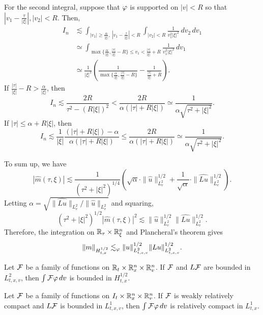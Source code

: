 \documentclass[12pt]{article}
\begin{document}
\begin{pf}
For the second integral, suppose that $\varphi$ is supported on $|v|<R$ so that $|v_1-\frac\tau{|\xi|}|,|v_2|<R$.
Then,
\begin{align*}
I_n&\lesssim\int_{|v_1|\ge\frac\alpha{|\xi|},\ |v_1-\frac\tau{|\xi|}|<R}\int_{|v_2|<R}\frac1{v_1^2|\xi|^2}\,dv_2\,dv_1\\
&\simeq\int_{\max\{\frac\alpha{|\xi|},\frac{|\tau|}{|\xi|}-R\}\le v_1<\frac{|\tau|}{|\xi|}+R}\frac1{v_1^2|\xi|^2}\,dv_1\\
&\simeq\frac1{|\xi|^2}(\frac1{\max\{\frac\alpha{|\xi|},\frac{|\tau|}{|\xi|}-R\}}-\frac1{\frac{|\tau|}{|\xi|}+R}).
\end{align*}
If $\frac{|\tau|}{|\xi|}-R>\frac\alpha{|\xi|}$, then
\[I_n\lesssim\frac{2R}{\tau^2-(R|\xi|)^2}<\frac{2R}{\alpha(|\tau|+R|\xi|)}\simeq\frac1{\alpha\sqrt{\tau^2+|\xi|^2}}.\]
If $|\tau|\le\alpha+R|\xi|$, then
\[I_n\lesssim\frac1{|\xi|}\frac{(|\tau|+R|\xi|)-\alpha}{\alpha(|\tau|+R|\xi|)}\le\frac{2R}{\alpha(|\tau|+R|\xi|)}\simeq\frac1{\alpha\sqrt{\tau^2+|\xi|^2}}.\]

To sum up, we have
\[|\hat m(\tau,\xi)|\lesssim\frac1{(\tau^2+|\xi|^2)^{1/4}}(\sqrt\alpha\cdot\|\hat u\|_{L_v^2}^{1/2}+\frac1{\sqrt\alpha}\cdot\|\hat{Lu}\|_{L_v^2}^{1/2}).\]
Letting $\alpha=\sqrt{\|\hat{Lu}\|_{L_v^2}/\|\hat u\|_{L_v^2}}$ and squaring,
\[(\tau^2+|\xi|^2)^{1/2}|\hat m(\tau,\xi)|^2\lesssim\|\hat u\|_{L_v^2}^{1/2}\|\hat{Lu}\|_{L_v^2}^{1/2}.\]
Therefore, the integration on $\mathbb{R}_\tau\times\mathbb{R}_\xi^n$ and Plancheral's theorem gives
\[\|m\|_{H_{t,x}^{1/2}}\lesssim_\varphi\|u\|_{L_{t,x,v}^2}^{1/2}\|Lu\|_{L_{t,x,v}^2}^{1/2}.\]
\end{pf}


\begin{cor}
Let $\mathcal{F}$ be a family of functions on $\mathbb{R}_t\times\mathbb{R}_x^n\times\mathbb{R}_v^n$.
If $\mathcal{F}$ and $L\mathcal{F}$ are bounded in $L_{t,x,v}^2$, then $\int\mathcal{F}\varphi\,dv$ is bounded in $H_{t,x}^{1/2}$.
\end{cor}

\begin{thm}
Let $\mathcal{F}$ be a family of functions on $I_t\times\mathbb{R}_x^n\times\mathbb{R}_v^n$.
If $\mathcal{F}$ is weakly relatively compact and $L\mathcal{F}$ is bounded in $L_{t,x,v}^1$, then $\int\mathcal{F}\varphi\,dv$ is relatively compact in $L_{t,x}^1$.
\end{thm}
\end{document}

